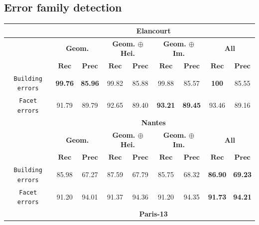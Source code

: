     \subsection{Error family detection}
        \label{subsec::experiments::finesse::2}
        \begin{table}[htbp]
            \footnotesize
            \centering
            \begin{tabular}{|c | c c | c c | c c | c c |}
                \hline
                & \multicolumn{8}{c|}{\textbf{Elancourt}}\\
                \hline
                & \multicolumn{2}{c|}{\textbf{Geom.}} & \multicolumn{2}{c|}{\textbf{Geom. \(\oplus\) Hei.}} & \multicolumn{2}{c|}{\textbf{Geom. \(\oplus\) Im.}} & \multicolumn{2}{x{1.8cm}|}{\textbf{All}}\\
                \cline{2-9}
                & \(\bm{Rec}\) & \(\bm{Prec}\) &  \(\bm{Rec}\) & \(\bm{Prec}\) &  \(\bm{Rec}\) & \(\bm{Prec}\) &  \(\bm{Rec}\) & \(\bm{Prec}\) \\
                \hline
                \texttt{Building errors} & \textbf{99.76} & \textbf{85.96} & 99.82 & 85.88 & 99.88 & 85.57 & \textbf{100} & 85.55 \\
                \hline
                \texttt{Facet errors} & 91.79 & 89.79 & 92.65 & 89.40 & \textbf{93.21} & \textbf{89.45} & 93.46 & 89.16 \\
                \hline
                \hline
                & \multicolumn{8}{c|}{\textbf{Nantes}}\\
                \hline
                & \multicolumn{2}{c|}{\textbf{Geom.}} & \multicolumn{2}{c|}{\textbf{Geom. \(\oplus\) Hei.}} & \multicolumn{2}{c|}{\textbf{Geom. \(\oplus\) Im.}} & \multicolumn{2}{x{1.8cm}|}{\textbf{All}}\\
                \cline{2-9}
                & \(\bm{Rec}\) & \(\bm{Prec}\) &  \(\bm{Rec}\) & \(\bm{Prec}\) &  \(\bm{Rec}\) & \(\bm{Prec}\) &  \(\bm{Rec}\) & \(\bm{Prec}\) \\
                \hline
                \texttt{Building errors} & 85.98 & 67.27 & 87.59 & 67.79 & 85.75 & 68.32 & \textbf{86.90} & \textbf{69.23} \\
                \hline
                \texttt{Facet errors} & 91.20 & 94.01 & 91.37 & 94.36 & 91.20 & 94.35 & \textbf{91.73} & \textbf{94.21}\\
                \hline
                \hline
                & \multicolumn{8}{c|}{\textbf{Paris-13}}\\
                \hline

\end{tabular}
\end{table}
